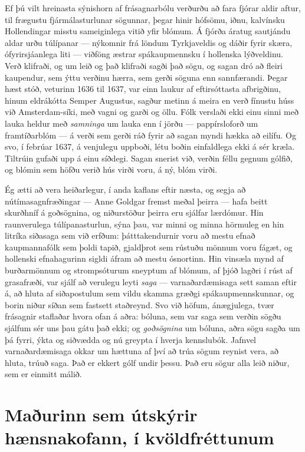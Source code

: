 Ef þú vilt hreinasta sýnishorn af frásagnarbólu verðurðu að fara fjórar aldir aftur, til frægustu fjármálasturlunar sögunnar, þegar hinir hófsömu, iðnu, kalvínsku Hollendingar misstu sameiginlega vitið yfir blómum. Á fjórða áratug sautjándu aldar urðu túlípanar — nýkomnir frá löndum Tyrkjaveldis og dáðir fyrir skæra, ófyrirsjáanlega liti — viðföng æstrar spákaupmennsku í hollenska lýðveldinu. Verð klifraði, og um leið og það klifraði sagði það sögu, og sagan dró að fleiri kaupendur, sem ýttu verðinu hærra, sem gerði söguna enn sannfærandi. Þegar hæst stóð, veturinn 1636 til 1637, var einn laukur af eftirsóttasta afbrigðinu, hinum eldrákótta Semper Augustus, sagður metinn á meira en verð fínustu húss við Amsterdam-síki, með vagni og garði og öllu. Fólk verslaði ekki einu sinni með lauka heldur með \emph{samninga} um lauka enn í jörðu — pappírsloforð um framtíðarblóm — á verði sem gerði ráð fyrir að sagan myndi hækka að eilífu. Og svo, í febrúar 1637, á venjulegu uppboði, létu boðin einfaldlega ekki á sér kræla. Tiltrúin gufaði upp á einu síðdegi. Sagan snerist við, verðin féllu gegnum gólfið, og blómin sem höfðu verið hús virði voru, á ný, blóm virði.

Ég ætti að vera heiðarlegur, í anda kaflans eftir næsta, og segja að nútímasagnfræðingar — Anne Goldgar fremst meðal þeirra — hafa beitt skurðhníf á goðsögnina, og niðurstöður þeirra eru sjálfar lærdómur. Hin raunverulega túlípanasturlun, sýna þau, var minni og minna hörmuleg en hin litríka siðasaga sem við erfðum: þátttakendurnir voru að mestu efnað kaupmannafólk sem þoldi tapið, gjaldþrot sem rústuðu mönnum voru fágæt, og hollenski efnahagurinn sigldi áfram að mestu ósnortinn. Hin vinsæla mynd af burðarmönnum og strompsóturum sneyptum af blómum, af þjóð lagðri í rúst af grasafræði, var sjálf að verulegu leyti \emph{saga} — varnaðardæmisaga sett saman eftir á, að hluta af siðapostulum sem vildu skamma græðgi spákaupmennskunnar, og borin niður síðan sem fastsett staðreynd. Svo við höfum, ánægjulega, tvær frásagnir staflaðar hvora ofan á aðra: bóluna, sem var saga sem verðin sögðu sjálfum sér uns þau gátu það ekki; og \emph{goðsögnina} um bóluna, aðra sögu sagða um þá fyrri, ýkta og siðvædda og nú greypta í hverja kennslubók. Jafnvel varnaðardæmisaga okkar um hættuna af því að trúa sögum reynist vera, að hluta, trúuð saga. Það er ekkert gólf undir þessu. Það eru sögur alla leið niður, sem er einmitt málið.

\section*{Maðurinn sem útskýrir hænsnakofann, í kvöldfréttunum}

